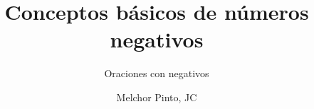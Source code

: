 \documentclass{guia}
\title{Conceptos básicos de números negativos}
\subtitle{Oraciones con negativos}
\author{Melchor Pinto, JC}
\begin{document}
%
\begin{questions}
\questionboxed{}
\end{questions}
\end{document}
